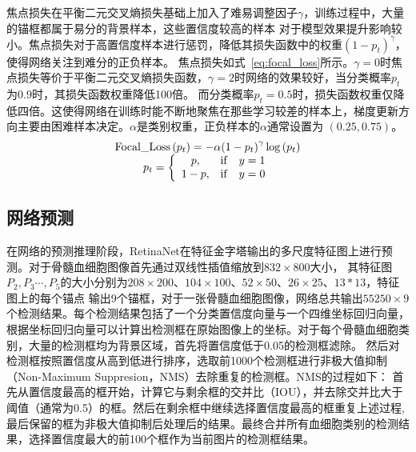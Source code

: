 焦点损失在平衡二元交叉熵损失基础上加入了难易调整因子$\gamma$，训练过程中，大量的锚框都属于易分的背景样本，这些置信度较高的样本
对于模型效果提升影响较小。焦点损失对于高置信度样本进行惩罚，降低其损失函数中的权重$(1-p_t)^{\gamma}$，使得网络关注到难分的正负样本。
焦点损失如式~\ref{eq:focal_loss}所示。$\gamma=0$时焦点损失等价于平衡二元交叉熵损失函数，$\gamma=2$时网络的效果较好，当分类概率$p_t$为0.9时，其损失函数权重降低100倍。
而分类概率$p_t = 0.5$时，损失函数权重仅降低四倍。这使得网络在训练时能不断地聚焦在那些学习较差的样本上，梯度更新方向主要由困难样本决定。$\alpha$是类别权重，正负样本的$\alpha$通常设置为
$(0.25, 0.75)$。
\begin{equation}               
  \begin{array}{*{20}{c}} {{\rm{Focal\_Loss}}\left( {{p_t}} \right) =  - \alpha {{\left( {1 - {p_t}} \right)}^\gamma }\log \left( {{p_t}} \right)}\\ 
    {{p_t} = \left\{ {\begin{array}{*{20}{c}} {p,}&{{\rm{ if }}}&{y = 1}\\ {1 - p,}&{{\rm{ if }}}&{y = 0} \end{array}} \right.} \end{array}    
  \label{eq:focal_loss}     
\end{equation} 

\subsection{网络预测}

在网络的预测推理阶段，RetinaNet在特征金字塔输出的多尺度特征图上进行预测。对于骨髓血细胞图像首先通过双线性插值缩放到$832 \times 800$大小，
其特征图$P_2, P_3 \cdots, P_5$的大小分别为$208 \times 200$、$104 \times 100$、$52 \times 50$、$ 26 \times 25$、$13 * 13$，特征图上的每个锚点
输出9个锚框，对于一张骨髓血细胞图像，网络总共输出$55250 \times 9$个检测结果。每个检测结果包括了一个分类置信度向量与一个四维坐标回归向量，
根据坐标回归向量可以计算出检测框在原始图像上的坐标。对于每个骨髓血细胞类别，大量的检测框均为背景区域，首先将置信度低于0.05的检测框滤除。
然后对检测框按照置信度从高到低进行排序，选取前1000个检测框进行非极大值抑制（Non-Maximum Suppresion，NMS）\cite{neubeck2006efficient}去除重复的检测框。NMS的过程如下：
首先从置信度最高的框开始，计算它与剩余框的交并比（IOU），并去除交并比大于阈值（通常为0.5）的框。然后在剩余框中继续选择置信度最高的框重复上述过程,
最后保留的框为非极大值抑制后处理后的结果。最终合并所有血细胞类别的检测结果，选择置信度最大的前100个框作为当前图片的检测框结果。


